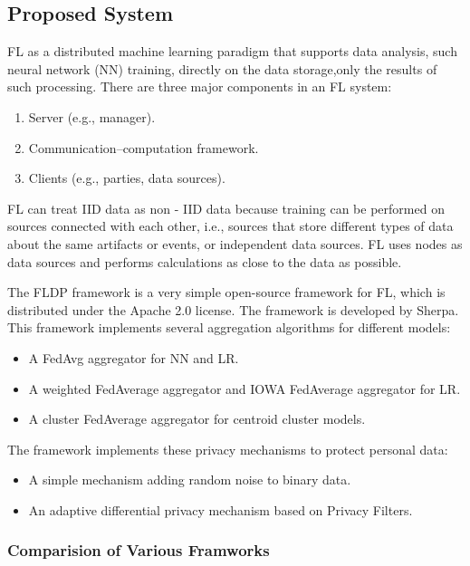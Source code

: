 \documentclass[14pt]{extarticle}
\begin{document}
\subsection{Proposed System}

\par FL as a distributed machine learning paradigm that supports data analysis, such neural network (NN) training, directly on the data storage,only the results of such processing. There are three major components in an FL system:

\begin{enumerate}
    \item Server (e.g., manager).
    \item Communication–computation framework.
    \item Clients (e.g., parties, data sources).
\end{enumerate}

\par FL can treat IID data as non - IID data because training can be performed on sources connected with each other, i.e., sources that store different types of data about the same artifacts or events, or independent data sources. FL uses nodes as data sources and performs calculations as close to the data as possible.
\par The FLDP framework is a very simple open-source framework for FL, which is distributed under the Apache 2.0 license. The framework is developed by Sherpa. This framework implements several aggregation algorithms for different models:
\begin{itemize}
    \item A FedAvg aggregator for NN and LR.
    \item A weighted FedAverage aggregator and IOWA FedAverage aggregator for LR.
    \item A cluster FedAverage aggregator for centroid cluster models.
\end{itemize}

\par The framework implements these privacy mechanisms to protect personal data:
\begin{itemize}
    \item A simple mechanism adding random noise to binary data.
    \item An adaptive differential privacy mechanism based on Privacy Filters.
\end{itemize}

\newpage
\subsubsection{Comparision of Various Framworks}
\end{document}
